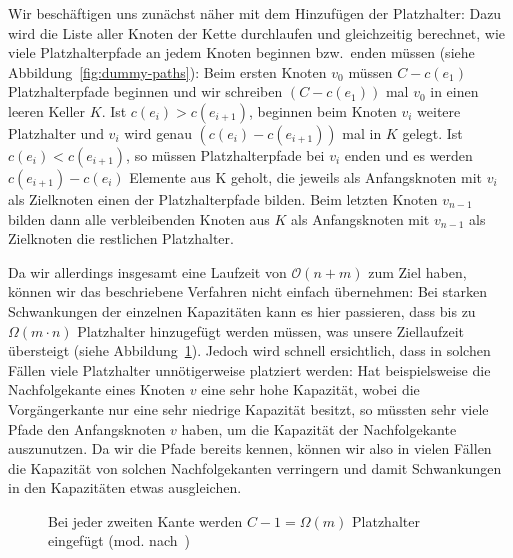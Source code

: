 Wir beschäftigen uns zunächst näher mit dem Hinzufügen der Platzhalter:
Dazu wird die Liste aller Knoten der Kette durchlaufen und gleichzeitig berechnet, wie viele Platzhalterpfade an jedem Knoten
beginnen bzw.\ enden müssen (siehe Abbildung~\ref{fig:dummy-paths}):
Beim ersten Knoten $v_0$ müssen $C - c(e_1)$ Platzhalterpfade beginnen und wir schreiben $(C - c(e_1))$ mal $v_0$ in einen
leeren Keller $K$.
Ist $c(e_i) > c(e_{i+1})$, beginnen beim Knoten $v_{i}$ weitere Platzhalter und $v_i$ wird genau $(c(e_i) - c(e_{i+1}))$ mal in $K$ gelegt.
Ist $c(e_i) < c(e_{i+1})$, so müssen Platzhalterpfade bei $v_i$ enden und es werden $c(e_{i+1}) - c(e_i)$ Elemente aus K geholt, die jeweils als Anfangsknoten mit $v_i$
als Zielknoten einen der Platzhalterpfade bilden.
Beim letzten Knoten $v_{n-1}$ bilden dann alle verbleibenden Knoten aus $K$ als Anfangsknoten mit $v_{n-1}$ als Zielknoten die restlichen Platzhalter.

Da wir allerdings insgesamt eine Laufzeit von $\mathcal O(n+m)$ zum Ziel haben, können wir das beschriebene Verfahren
nicht einfach übernehmen:
Bei starken Schwankungen der einzelnen Kapazitäten kann es hier passieren, dass bis zu $\Omega(m\cdot n)$
Platzhalter hinzugefügt werden müssen, was unsere Ziellaufzeit übersteigt (siehe Abbildung~\ref{fig:dummy-paths-too-many}).
Jedoch wird schnell ersichtlich, dass in solchen Fällen viele Platzhalter unnötigerweise platziert werden:
Hat beispielsweise die Nachfolgekante eines Knoten $v$ eine sehr hohe Kapazität, wobei die Vorgängerkante nur eine sehr
niedrige Kapazität besitzt, so müssten sehr viele Pfade den Anfangsknoten $v$ haben, um die Kapazität der
Nachfolgekante auszunutzen.
Da wir die Pfade bereits kennen, können wir also in vielen Fällen die Kapazität von solchen Nachfolgekanten verringern und
damit Schwankungen in den Kapazitäten etwas ausgleichen.

\begin{figure}[htbp]
	\centering
	\def\svgwidth{250bp}
	
	\caption{Bei jeder zweiten Kante werden $C-1=\Omega(m)$ Platzhalter eingefügt (mod. nach~\cite{paper})}
	\label{fig:dummy-paths-too-many}
\end{figure}

